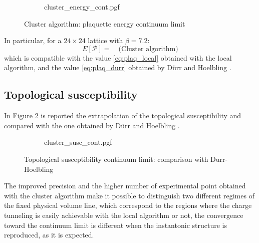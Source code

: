 \begin{figure}[!htb]
    \centering
    \begin{subfigure}{\textwidth}
        \centering
        {cluster_energy_cont.pgf}
    \end{subfigure}\vspace{1.5em}
    \begin{subfigure}{\textwidth}
        \centering
        
    \end{subfigure}
    \caption{Cluster algorithm: plaquette energy continuum limit}
    \label{fig:cluster_energy_cont}
\end{figure}

In particular, for a $24\times24$ lattice with $\beta=7.2$:
\[
    E[\mathcal P] =  \quad \text{(Cluster algorithm)}
\]
which is compatible with the value \eqref{eq:plaq_local} obtained with the local algorithm,
and the value \eqref{eq:plaq_durr} obtained by D\"urr and Hoelbling \cite{durr-hoelbling:2005}.

\subsection*{Topological susceptibility}
In Figure \ref{fig:cluster_susc_cont} is reported the extrapolation of the topological susceptibility
and compared with the one obtained by D\"urr and Hoelbling \cite{durr-hoelbling:2005}.

\begin{figure}[!htb]
    \centering
    \begin{subfigure}{\textwidth}
        \centering
        {cluster_susc_cont.pgf}
    \end{subfigure}\vspace{1.5em}
    \begin{subfigure}{\textwidth}
        \centering
        
    \end{subfigure}
    \caption{Topological susceptibility continuum limit: comparison with Durr-Hoelbling}
    \label{fig:cluster_susc_cont}
\end{figure}

The improved precision and the higher number of experimental point obtained with the cluster algorithm
make it possible to distinguish two different regimes of the fixed physical volume line,
which correspond to the regions where the charge tunneling is easily achievable with the local algorithm or not,
\ie the convergence toward the continuum limit is different when the instantonic structure is reproduced, as it is expected.

